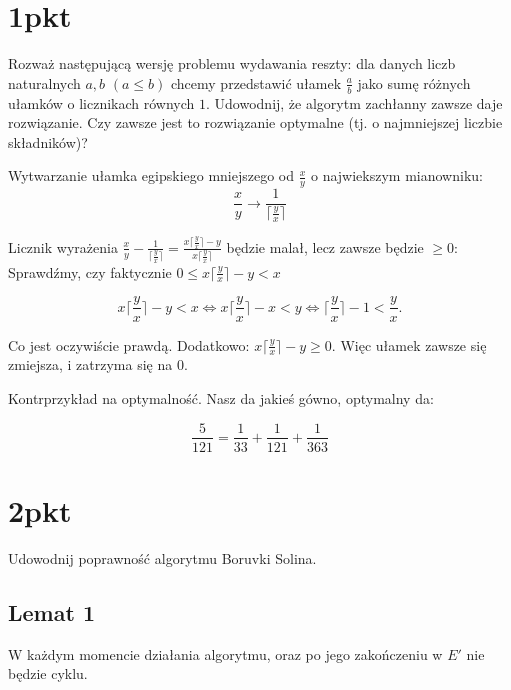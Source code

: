 \documentclass[svgnames]{report}
\begin{document}
\section{1pkt}
\begin{framed}
Rozważ następującą wersję problemu wydawania reszty: dla danych liczb naturalnych
$a, b$ $(a \leq b)$ chcemy przedstawić ułamek $\frac{a}{b}$ jako sumę różnych ułamków o licznikach równych
$1$. Udowodnij, że algorytm zachłanny zawsze daje rozwiązanie. Czy zawsze jest to rozwiązanie optymalne (tj. o najmniejszej liczbie składników)?
\end{framed}

Wytwarzanie ułamka egipskiego mniejszego od $\frac{x}{y}$ o najwiekszym mianowniku: 
\[\frac{x}{y} \rightarrow \frac{1}{\lceil \frac{y}{x} \rceil}\]

\noindent Licznik wyrażenia $\frac{x}{y} - \frac{1}{\lceil \frac{y}{x} \rceil} = \frac{x \lceil \frac{y}{x} \rceil - y}{x\lceil \frac{y}{x} \rceil}$ będzie malał, lecz zawsze będzie $\ge 0$:\\

\noindent Sprawdźmy, czy faktycznie $ 0 \leq x \lceil \frac{y}{x} \rceil - y < x$

\[x \lceil \frac{y}{x} \rceil - y < x \Leftrightarrow x \lceil \frac{y}{x} \rceil - x < y \Leftrightarrow \lceil \frac{y}{x} \rceil - 1 < \frac{y}{x} \textrm{.}\]

\noindent Co jest oczywiście prawdą. Dodatkowo: $x \lceil \frac{y}{x} \rceil - y \ge 0$. Więc ułamek zawsze się zmiejsza, i zatrzyma się na $0$.

\noindent Kontrprzykład na optymalność. Nasz da jakieś gówno, optymalny da:

\[\frac{5}{121}=\frac{1}{33}+\frac{1}{121}+\frac{1}{363}\]


\section{2pkt}
\begin{framed}
Udowodnij poprawność algorytmu Boruvki Solina.
\end{framed}


\subsection{Lemat 1}
\noindent W każdym momencie działania algorytmu, oraz po jego zakończeniu w $E'$ nie będzie cyklu.\\
\end{document}
